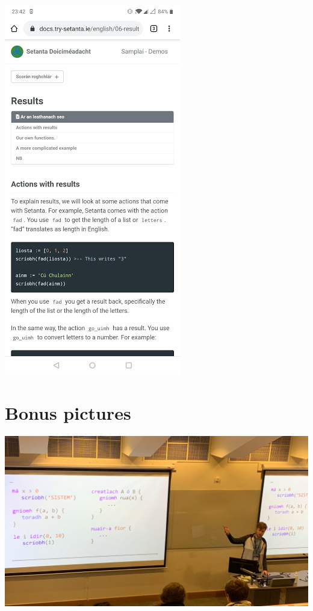 \begin{center}
    \includegraphics[scale=0.5]{app4assets/docs-en-mobile}
    \label{screenshot:docs-en-mobile}
\end{center}

\section{Bonus pictures}
\begin{center}
    \includegraphics[scale=0.21]{app4assets/talk-pic}
    \label{screenshot:sistem-talk}
\end{center}
